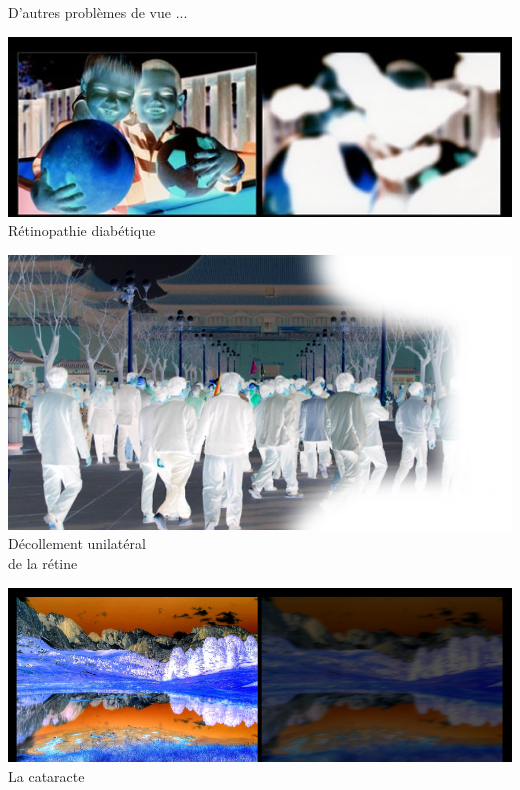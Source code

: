 \documentclass{beamer}
\begin{document}
\begin{frame}
 {D'autres problèmes de vue ... }

 \vskip 0.5cm
 \begin{center}
 \begin{minipage}{0.45\linewidth}
  \centering \includegraphics[width=1\linewidth]{images/visual_problem2_neg.png} \\
  R\'etinopathie diab\'etique
 \end{minipage} \qquad \pause
 \begin{minipage}{0.45\linewidth}
  \centering \includegraphics[width=1\linewidth]{images/visual_problem3_neg.png} \\
  {\small D\'ecollement unilat\'eral \\ de la r\'etine}
 \end{minipage} \pause \vskip 0.2cm
 \begin{minipage}{0.6\linewidth}
  \centering \includegraphics[width=1\linewidth]{images/visual_problem4_neg.png}
  La cataracte
 \end{minipage}
 \end{center}

\end{frame}
\end{document}
